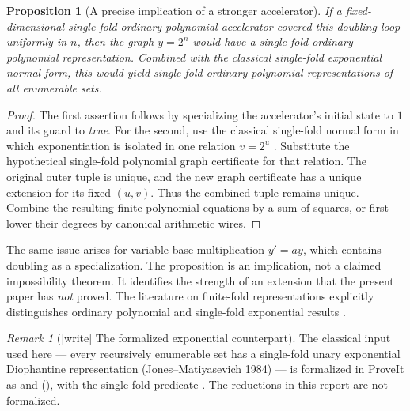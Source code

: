 \documentclass[11pt,a4paper]{article}
\newtheorem{proposition}[proposition]{Proposition}
\theoremstyle{definition}
\theoremstyle{remark}
\newtheorem{remark}[remark]{Remark}
\begin{document}
\begin{proposition}[A precise implication of a stronger accelerator]
\label{cdc:pt:prop:exponential-boundary}
If a fixed-dimensional single-fold ordinary polynomial accelerator covered
this doubling loop uniformly in $n$, then the graph $y=2^n$ would have a
single-fold ordinary polynomial representation. Combined with the
classical single-fold exponential normal form, this would yield
single-fold ordinary polynomial representations of all enumerable sets.
\end{proposition}
\begin{proof}
The first assertion follows by specializing the accelerator's initial
state to $1$ and its guard to \emph{true}. For the second, use the
classical single-fold normal form in which exponentiation is isolated in
one relation $v=2^u$ \cite[p.~588]{cco2024}. Substitute the
hypothetical single-fold polynomial graph certificate for that relation.
The original outer tuple is unique, and the new graph certificate has a
unique extension for its fixed $(u,v)$. Thus the combined tuple remains
unique. Combine the resulting finite polynomial equations by a sum of
squares, or first lower their degrees by canonical arithmetic wires.
\end{proof}

The same issue arises for variable-base multiplication $y'=ay$, which
contains doubling as a specialization. The proposition is an implication,
not a claimed impossibility theorem. It identifies the strength of an
extension that the present paper has \emph{not} proved. The literature on
finite-fold representations explicitly distinguishes ordinary polynomial
and single-fold exponential results \cite{mat2010}.

\begin{remark}[\textup{[write]} The formalized exponential counterpart]\label{cdc:bd:rem:sfu}
The classical input used here --- every recursively enumerable set has a
single-fold unary exponential Diophantine representation
(Jones--Matiyasevich 1984) --- is formalized in ProveIt as
 and 
(),
with the single-fold predicate . The reductions in
this report are not formalized.
\end{remark}

\end{document}
